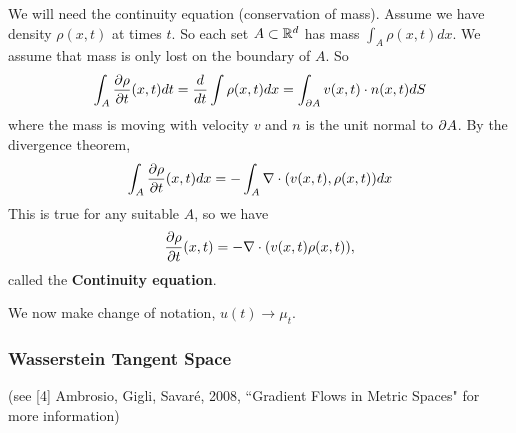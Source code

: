 \documentclass[12pt,a4paper]{article}
\begin{document}
We will need the continuity equation (conservation of mass). Assume we have density $\rho (x,t)$ at times $t$. So each set $A\subset \mathbb{R}^d$ has mass $\int_A \rho(x,t) dx$. We assume that mass is only lost on the boundary of $A$. So
\begin{align*}
\int_A \frac{\partial \rho}{\partial t} (x,t) dt = \frac{d}{dt} \int \rho(x,t) dx = \int_{\partial A} v(x,t)\cdot n(x,t) dS 
\end{align*}
where the mass is moving with velocity $v$ and $n$ is the unit normal to $\partial A$. By the divergence theorem,
\begin{align*}
\int_A \frac{\partial \rho}{\partial t}(x, t) dx = -\int_A \nabla \cdot (v(x,t) , \rho(x,t)) dx
\end{align*}
This is true for any suitable $A$, so we have
\begin{align*}
\frac{\partial \rho}{\partial t}(x,t) = - \nabla \cdot (v(x,t) \rho(x,t)), 
\end{align*}
called the \textbf{Continuity equation}.
\s

We now make change of notation, $u(t) \rightarrow \mu_t$.
\s

\subsubsection{Wasserstein Tangent Space}

(see [4] Ambrosio, Gigli, Savar\'{e}, 2008, ``Gradient Flows in Metric Spaces" for more information)
\s
\end{document}
